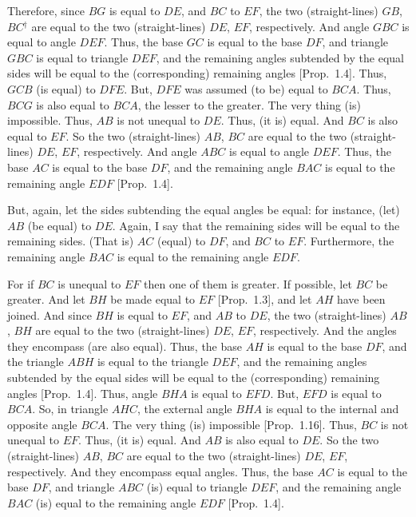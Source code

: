 Therefore, since $BG$ is equal to $DE$, and $BC$ to $EF$, the two (straight-lines)
$GB$, $BC$$^\dag$ are equal to the two (straight-lines) $DE$, $EF$, respectively. And angle
$GBC$ is equal to angle $DEF$. Thus, the base $GC$ is equal to the base $DF$,
and triangle $GBC$ is equal to triangle $DEF$, and the remaining angles 
subtended by the equal sides will
be equal to the (corresponding) remaining angles [Prop.~1.4].
Thus, $GCB$ (is equal) to $DFE$. But,  $DFE$ was assumed (to be) equal to $BCA$.
Thus, $BCG$ is also equal to $BCA$, the lesser to the greater. The very thing (is) impossible. Thus, $AB$ is not unequal to $DE$. Thus, (it is) equal. And $BC$ is
also equal to $EF$. So the two (straight-lines) $AB$, $BC$ are equal to the two (straight-lines) $DE$, $EF$, respectively. And angle $ABC$ is equal to
angle $DEF$. Thus, the base $AC$ is equal to the base $DF$, and the remaining
angle $BAC$ is equal to the remaining angle $EDF$ [Prop.~1.4].

But, again, let the sides subtending the equal angles be equal: for instance, 
(let) $AB$ (be equal) to
$DE$.  Again, I say that the remaining sides will be equal to the remaining
sides. (That is) $AC$ (equal) to $DF$, and $BC$ to $EF$. Furthermore, the remaining angle
$BAC$ is equal to the remaining angle $EDF$.

For if $BC$ is unequal to $EF$ then one of them is greater. If possible, let $BC$
be greater. And let $BH$ be made equal to $EF$ [Prop.~1.3], and let $AH$ have been joined.
And since $BH$ is equal to $EF$, and $AB$ to $DE$, the two (straight-lines) $AB$, $BH$
are equal to the two (straight-lines) $DE$, $EF$, respectively. And the angles
they encompass (are also equal). Thus, the base $AH$ is equal to the base  
$DF$, and the triangle $ABH$ is equal to the triangle $DEF$, and the
remaining angles subtended by the equal sides will be equal to the
(corresponding) remaining angles [Prop.~1.4]. Thus, angle $BHA$ 
is equal to $EFD$. But, $EFD$ is equal to $BCA$. So, in triangle $AHC$,
the external angle $BHA$ is equal to the internal and opposite angle 
$BCA$. The very thing (is) impossible [Prop.~1.16]. Thus, $BC$ is not unequal to $EF$.
Thus, (it is) equal. And $AB$ is also equal to $DE$. So the two
(straight-lines) $AB$, $BC$ are equal to the two (straight-lines) $DE$, $EF$,
respectively. And they encompass equal angles. Thus, the base $AC$ is equal
to the base $DF$, and triangle $ABC$ (is) equal to triangle $DEF$, and the
remaining angle $BAC$ (is) equal to the remaining angle $EDF$ [Prop.~1.4].

